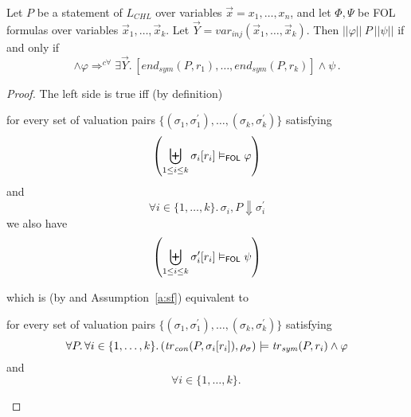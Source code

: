 \begin{lemma}\label{thm:chlAPCRLrelation}
    Let $P$ be a statement of $L_{\mathit{CHL}}$ over variables $\vec{x} = x_1,\ldots,x_n$,
    and let $\Phi,\Psi$ be FOL formulas over variables
    $\vec{x}_1,\ldots,\vec{x}_k$.
    Let $\vec{Y} = \mathit{var}_{\mathit{inj}}(\vec{x}_1, \ldots, \vec{x}_k)$.
    Then $||\varphi||\ P\ ||\psi||$ if and only if
    \begin{equation*}
        [\mathit{tr}_{\mathit{sym}}(P, r_1),\ldots,\mathit{tr}_{\mathit{sym}}(P, r_k)] \land \varphi
        \Rightarrow^{c\forall} \exists \vec{Y}.\, [\mathit{end}_{\mathit{sym}}(P, r_1),\ldots,\mathit{end}_{\mathit{sym}}(P, r_k)] \land \psi \, .
    \end{equation*}
\end{lemma}
\begin{proof}
    The left side is true iff (by definition)
    \begin{proofenv}
        for every set of valuation pairs $\{ (\sigma_1,\sigma_1^\prime),\ldots,(\sigma_k,\sigma_k^\prime) \}$
        satisfying
        \begin{equation*}
            \left( \biguplus_{1 \leq i \leq k} \sigma_i[r_i] \vDash_{\mathsf{FOL}} \varphi \right)
        \end{equation*}
        and
        \begin{equation*}
            \forall i \in \{ 1, \ldots, k \}.\, \sigma_i, P  \Downarrow \sigma^\prime_i
        \end{equation*}
        we also have
        \begin{equation*}
            \left( \biguplus_{1 \leq i \leq k} \sigma^\prime_i[r_i] \vDash_{\mathsf{FOL}} \psi \right)
        \end{equation*}
    \end{proofenv}
    which is (by  and Assumption~\ref{a:sf}) equivalent to
    \begin{proofenv}
        for every set of valuation pairs $\{ (\sigma_1,\sigma_1^\prime),\ldots,(\sigma_k,\sigma_k^\prime) \}$
        satisfying
        \begin{equation*}
            \forall P.\, \forall i \in \{ 1, \ldots, k \} . \,
                (\mathit{tr}_{\mathit{con}}(P, \sigma_i[r_i]), \rho_\sigma)
                \models \mathit{tr}_{\mathit{sym}}(P, r_i) \land \varphi
        \end{equation*}
        and
        \begin{equation*}
            \forall i \in \{ 1, \ldots, k \}.\,

\end{equation*}
\end{proofenv}
\end{proof}
